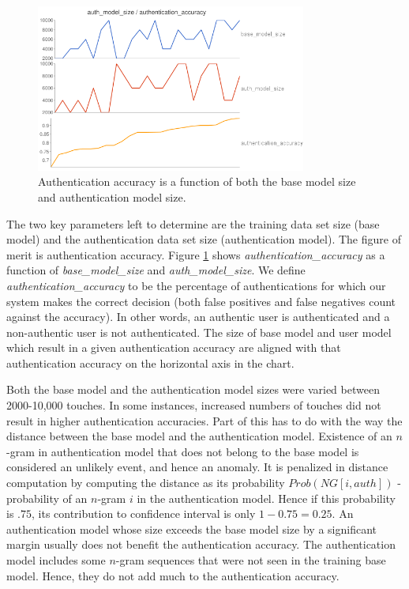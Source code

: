 \documentclass{acm_proc_article-sp}
\begin{document}
\begin{figure}
\centering
\includegraphics[width=3.5in]{authentication_accuracy_vs_model_size.png}
\caption{Authentication accuracy is a function of both the base model size and authentication model size.}
\label{fig:authentication_accuracy}
\end{figure}

%
The two key parameters left to determine are the training data set size (base model) and the 
authentication data set size (authentication model). The figure of merit is authentication accuracy. Figure \ref{fig:authentication_accuracy} shows {\it authentication\_accuracy} as a function of {\it base\_model\_size} 
and {\it auth\_model\_size}. We define {\it authentication\_accuracy} to be the percentage of authentications for which our system makes the correct decision (both false positives and
false negatives count against the accuracy). In other words, an authentic user is authenticated and a non-authentic user is not authenticated. The size of base model and user model which result in a given authentication accuracy are aligned with that authentication accuracy on the horizontal axis in the chart. 

Both the base model and the authentication model sizes were varied between 2000-10,000 touches.
In some instances, increased numbers of touches did not result in higher authentication accuracies. 
Part of this has to do with the way the distance between the base model and the authentication
model. Existence of an $n$-gram in authentication model that does not belong to the base model
is considered an unlikely event, and hence an anomaly. It is penalized in distance computation
by computing the distance as its probability $Prob(NG[i, auth])$ - probability of an $n$-gram
$i$ in the authentication model. Hence if this probability is $.75$, its contribution to
confidence interval is only $1-0.75=0.25$.
An authentication model whose size exceeds the base model size by a significant margin usually
does not benefit the authentication accuracy. The authentication model includes some
$n$-gram sequences that were not seen in the training base model. Hence, they do not add much to the
authentication accuracy.
\end{document}
